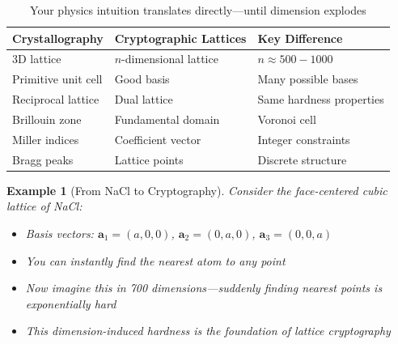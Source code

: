 \documentclass[11pt,a4paper]{article}
\newtheorem{example}{Example}
\begin{document}
\begin{table}[h]
\centering
\begin{tabular}{|l|l|l|}
\hline
\textbf{Crystallography} & \textbf{Cryptographic Lattices} & \textbf{Key Difference} \\
\hline
3D lattice & $n$-dimensional lattice & $n \approx 500-1000$ \\
Primitive unit cell & Good basis & Many possible bases \\
Reciprocal lattice & Dual lattice & Same hardness properties \\
Brillouin zone & Fundamental domain & Voronoi cell \\
Miller indices & Coefficient vector & Integer constraints \\
Bragg peaks & Lattice points & Discrete structure \\
\hline
\end{tabular}
\caption{Your physics intuition translates directly—until dimension explodes}
\end{table}

\begin{example}[From NaCl to Cryptography]
Consider the face-centered cubic lattice of NaCl:
\begin{itemize}
    \item Basis vectors: $\mathbf{a}_1 = (a,0,0)$, $\mathbf{a}_2 = (0,a,0)$, $\mathbf{a}_3 = (0,0,a)$
    \item You can instantly find the nearest atom to any point
    \item Now imagine this in 700 dimensions—suddenly finding nearest points is exponentially hard
    \item This dimension-induced hardness is the foundation of lattice cryptography
\end{itemize}
\end{example}
\end{document}
